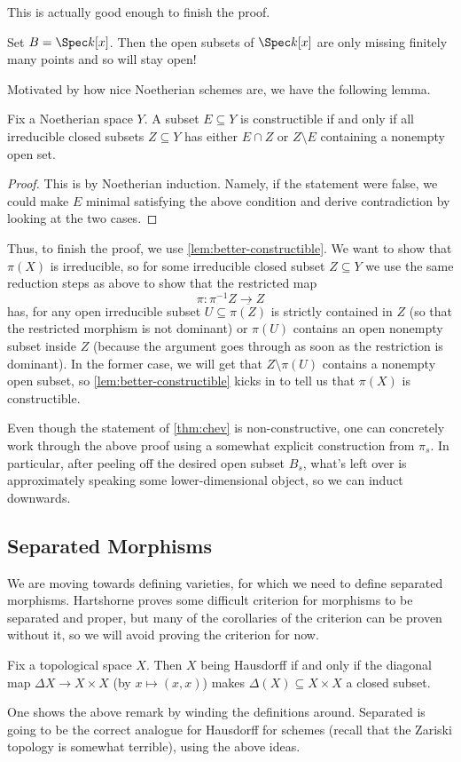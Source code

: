 \documentclass[../notes.tex]{subfiles}
\begin{document}
This is actually good enough to finish the proof.
\begin{example}
	Set $B=\Spec k[x]$. Then the open subsets of $\Spec k[x]$ are only missing finitely many points and so will stay open!
\end{example}
Motivated by how nice Noetherian schemes are, we have the following lemma.
\begin{lemma} \label{lem:better-constructible}
	Fix a Noetherian space $Y$. A subset $E\subseteq Y$ is constructible if and only if all irreducible closed subsets $Z\subseteq Y$ has either $E\cap Z$ or $Z\setminus E$ containing a nonempty open set.
\end{lemma}
\begin{proof}
	This is by Noetherian induction. Namely, if the statement were false, we could make $E$ minimal satisfying the above condition and derive contradiction by looking at the two cases.
\end{proof}
Thus, to finish the proof, we use \autoref{lem:better-constructible}. We want to show that $\pi(X)$ is irreducible, so for some irreducible closed subset $Z\subseteq Y$ we use the same reduction steps as above to show that the restricted map
\[\pi\colon\pi^{-1}Z\to Z\]
has, for any open irreducible subset $U\subseteq\overline{\pi(Z)}$ is strictly contained in $Z$ (so that the restricted morphism is not dominant) or $\pi(U)$ contains an open nonempty subset inside $Z$ (because the argument goes through as soon as the restriction is dominant). In the former case, we will get that $Z\setminus\pi(U)$ contains a nonempty open subset, so \autoref{lem:better-constructible} kicks in to tell us that $\pi(X)$ is constructible.
\begin{remark}
	Even though the statement of \autoref{thm:chev} is non-constructive, one can concretely work through the above proof using a somewhat explicit construction from $\pi_s$. In particular, after peeling off the desired open subset $B_s$, what's left over is approximately speaking some lower-dimensional object, so we can induct downwards.
\end{remark}

\subsection{Separated Morphisms}
We are moving towards defining varieties, for which we need to define separated morphisms. Hartshorne proves some difficult criterion for morphisms to be separated and proper, but many of the corollaries of the criterion can be proven without it, so we will avoid proving the criterion for now.
\begin{remark}
	Fix a topological space $X$. Then $X$ being Hausdorff if and only if the diagonal map $\Delta X\to X\times X$ (by $x\mapsto(x,x)$) makes $\Delta(X)\subseteq X\times X$ a closed subset.
\end{remark}
One shows the above remark by winding the definitions around. Separated is going to be the correct analogue for Hausdorff for schemes (recall that the Zariski topology is somewhat terrible), using the above ideas.
\end{document}
